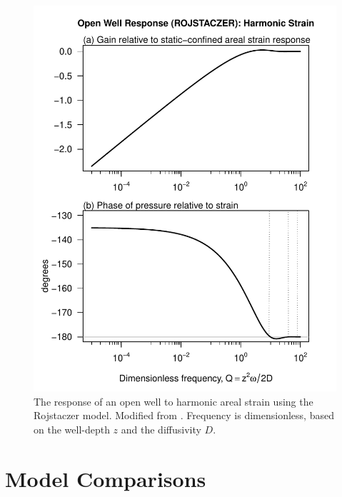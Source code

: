 \documentclass[10pt]{article}\usepackage[]{graphicx}\usepackage[]{color}
\makeatletter
\def\maxwidth{ %
  \ifdim\Gin@nat@width>\linewidth
    \linewidth
  \else
    \Gin@nat@width
  \fi
}
\newenvironment{knitrout}{}{} %
\makeatother
\begin{document}
\begin{figure}[htb!]
\begin{center}
\begin{knitrout}
\color{fgcolor}
\includegraphics[width=\maxwidth]{figure/ROJRESPFIG} 

\end{knitrout}

\caption{The response of an open well to harmonic areal strain using
the Rojstaczer model. Modified from \citet[][Fig.~3]{rojstaczer1988}.
Frequency is dimensionless, based on the well-depth $z$ and the diffusivity
$D$.}
\label{fig:owrsp-roj}
\end{center}
\end{figure}

\section{Model Comparisons}
\end{document}
